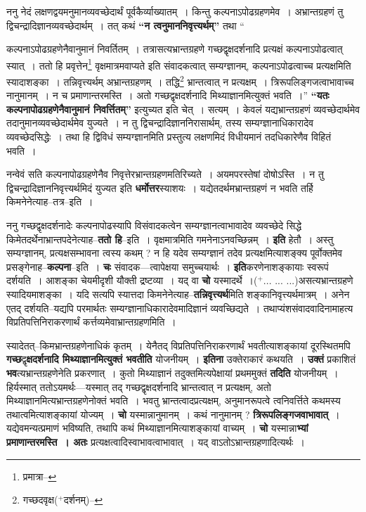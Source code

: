\documentclass[article,12pt,a4paper]{memoir}
\newcommand{\add}[1]{($^{+}$#1)}
\begin{document}
	  \pstart ननु नेदं लक्षणद्वयमनुमानव्यवच्छेदार्थं पूर्वकैर्व्याख्यातम् । किन्तु कल्पनाऽपोढग्रहणमेव । अभ्रान्तग्रहणं तु द्विचन्द्रादिज्ञानव्यवच्छेदार्थम् । तत् कथं \textbf{“न त्वनुमाननिवृत्त्यर्थम्”} तथा  \leavevmode{} “
	  
	कल्पनाऽपोढग्रहणेनैवानुमानं निवर्तितम् । तत्रासत्यभ्रान्तग्रहणे गच्छद्वृक्षदर्शनादि प्रत्यक्षं कल्पनाऽपोढत्वात् स्यात् । ततो हि प्रवृत्तेन\footnote{प्रमात्रा--\cite{dp-msD-n}} वृक्षमात्रमवाप्यते इति संवादकत्वात् सम्यग्ज्ञानम्, कल्पनाऽपोढत्वाच्च प्रत्यक्षमिति स्यादाशङ्का । तन्निवृत्त्यर्थम् अभ्रान्तग्रहणम् । तद्धि\footnote{गच्छदवृक्ष\add{दर्शनम्}--\cite{dp-msD-n}} भ्रान्तत्वात् न प्रत्यक्षम् । त्रिरूपलिङ्गजत्वाभावाच्च नानुमानम् । न च प्रमाणान्तरमस्ति । अतो गच्छद्वृक्षदर्शनादि मिथ्याज्ञानमित्युक्तं भवति ।” \textbf{“यतः कल्पनापोढग्रहणेनैवानुमानं निवर्त्तितम्”} इत्युच्यत इति चेत् । सत्यम् । केवलं यद्यभ्रान्तग्रहणं व्यवच्छेदार्थमेव तदानुमानव्यवच्छेदार्थमेव युज्यते । न तु द्विचन्द्रादिज्ञाननिरासार्थम्, तस्य सम्यग्ज्ञानाधिकारादेव व्यवच्छेदसिद्धेः । तथा हि द्विविधं सम्यग्ज्ञानमिति प्रस्तुत्य लक्षणमिदं विधीयमानं तदधिकारेणैव विहितं भवति ।
	\pend
      

	  \pstart नन्वेवं सति कल्पनापोढग्रहणेनैव निवृत्तेरभ्रान्तग्रहणमतिरिच्यते । अयमपरस्तेषां दोषोऽस्ति । न तु द्विचन्द्रादिज्ञाननिवृत्त्यर्थमिदं युज्यत इति \textbf{धर्मोत्तर}स्याशयः । यद्येतदर्थमभ्रान्तग्रहणं न भवति तर्हि किमनेनेत्याह--तत्र--इति ।
	\pend
      

	  \pstart ननु गच्छद्वृक्षदर्शनादेः कल्पनापोढस्यापि विसंवादकत्वेन सम्यग्ज्ञानत्वाभावादेव व्यवच्छेदे सिद्धे किमेतदर्थेनाभ्रान्तपदेनेत्याह--\textbf{ततो हि}--इति । वृक्षमात्रमिति गमनेनाऽनवच्छिन्नम् । \textbf{इति} हेतौ । अस्तु सम्यग्ज्ञानम्, प्रत्यक्षसम्भावना त्वस्य कथम् ? न हि यदेव सम्यग्ज्ञानं तदेव प्रत्यक्षमित्याशङ्क्य पूर्वोक्तमेव प्रसङ्गेनाह--\textbf{कल्पना}--इति । \textbf{चः} संवादक—त्वापेक्षया समुच्चयार्थः । \textbf{इति}करणेनाशङ्कायाः स्वरूपं दर्शयति । आशङ्का चेयमीदृशी यौक्ती द्रष्टव्या । यद् वा \textbf{चो} यस्मादर्थे ।\add{... ... ...}असत्यभ्रान्तग्रहणे स्यादियमाशङ्का । यदि सत्यपि स्यात्तदा किमनेनेत्याह--\textbf{तन्निवृत्त्यर्थ}मिति शङ्कानिवृत्त्यर्थमात्रम् । अनेन एतद् दर्शयति--यद्यपि परमार्थतः सम्यग्ज्ञानाधिकारादेवमादिज्ञानं व्यवच्छिद्यते । तथाप्यंशसंवादवादिनामाहत्य विप्रतिपत्तिनिराकरणार्थं क\leavevmode{}र्त्तव्यमेवाभ्रान्तग्रहणमिति ।
	\pend
      

	  \pstart स्यादेतत्--किमभ्रान्तग्रहणेनाधिकं कृतम् । येनैतद् विप्रतिपत्तिनिराकरणार्थं भवतीत्याशङ्कायां दूरस्थितमपि \textbf{गच्छ}द्वृ\textbf{क्षदर्शनादि मिथ्याज्ञानमित्युक्तं भवतीति} योजनीयम् । \textbf{इतिना} उक्तेराकारं कथयति । \textbf{उक्तं} प्रकाशितं \textbf{भव}त्यभ्रान्तग्रहणेनेति प्रकरणात् । कुतो मिथ्याज्ञानं तदुक्तमित्यपेक्षायां प्रथममुक्तं \textbf{तदिति} योजनीयम् । हिर्यस्मात् ततोऽयमर्थः—यस्मात् तद् गच्छद्वृक्षदर्शनादि भ्रान्तत्वात् न प्रत्यक्षम्, अतो मिथ्याज्ञानमित्यभ्रान्तग्रहणेनोक्तं भवति । भवतु भ्रान्तत्वादप्रत्यक्षम्, अनुमानरूपत्वे त्वनिवर्त्तिते कथमस्य तथात्वमित्याशङ्कायां योज्यम् । \textbf{चो} यस्मान्नानुमानम् । कथं नानुमानम् ? \textbf{त्रिरूपलिङ्गजवाभावात्} । यद्येवमन्यत्प्रमाणं भविष्यति, तथापि कथं मिथ्याज्ञानमित्याशङ्कायां वाच्यम् । \textbf{चो} यस्मान्ना\textbf{भ्यां प्रमाणान्तरमस्ति । अतः} प्रत्यक्षत्वादिस्वाभावत्वाभावात् । यद् वाऽतोऽभ्रान्तग्रहणादित्यर्थः ।
	\pend
      
\end{document}
